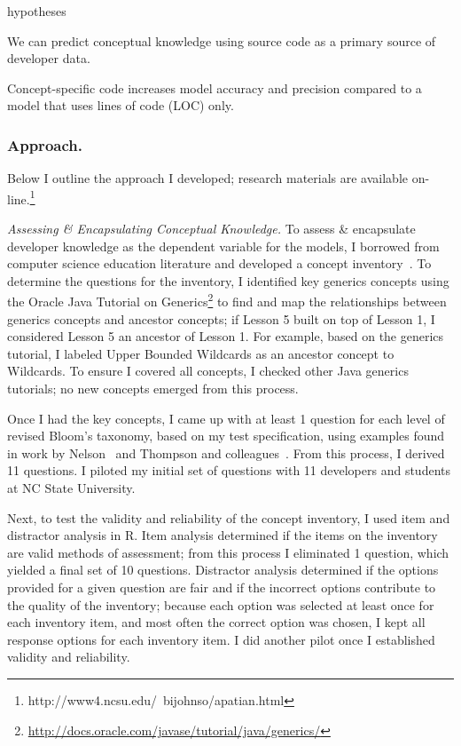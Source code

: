 \documentclass{llncs}
\begin{document}
\begin{labeling}{hypotheses}
	\item [H\textsubscript{1}] We can predict conceptual knowledge using source code as a primary source of developer data.
	\item [H\textsubscript{2}] Concept-specific code increases model accuracy and precision compared to a model that uses lines of code (LOC) only.
\end{labeling}

\subsubsection{Approach.}
Below I outline the approach I developed; research materials are available on-line.\footnote{http://www4.ncsu.edu/~bijohnso/apatian.html}

\vspace{0.5em}
\noindent\textit{Assessing \& Encapsulating Conceptual Knowledge.}
To assess \& encapsulate developer knowledge as the dependent variable for the models, I borrowed from computer science education literature and developed a concept inventory~\cite{tew2010assessing}. 
To determine the questions for the inventory, I identified key generics concepts using the Oracle Java Tutorial on Generics\footnote{\url{http://docs.oracle.com/javase/tutorial/java/generics/}} to find and map the relationships between generics concepts and ancestor concepts; if Lesson 5 built on top of Lesson 1, I considered Lesson 5 an ancestor of Lesson 1. For example, based on the generics tutorial, I labeled Upper Bounded Wildcards as an ancestor concept to Wildcards. To ensure I covered all concepts, I checked other Java generics tutorials; no new concepts emerged from this process.

Once I had the key concepts, I came up with at least 1 question for each level of revised Bloom's taxonomy, based on my test specification, using examples found in work by Nelson~\cite{nelson1967testing} and Thompson and colleagues~\cite{thompson2008bloom}.
From this process, I derived 11 questions.
I piloted my initial set of questions with 11 developers and students at NC State University. 

Next, to test the validity and reliability of the concept inventory, I used item and distractor analysis in R. Item analysis determined if the items on the inventory are valid methods of assessment; from this process I eliminated 1 question, which yielded a final set of 10 questions.  Distractor analysis determined if the options provided for a given question are fair and if the incorrect options contribute to the quality of the inventory; because each option was selected at least once for each inventory item, and most often the correct option was chosen, I kept all response options for each inventory item.
I did another pilot once I established validity and reliability.
\end{document}

